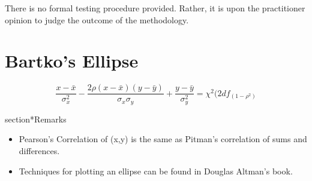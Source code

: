 \documentclass[12pt, a4paper]{report}
\theoremstyle{plain}
\theoremstyle{definition}
\theoremstyle{remark}
\begin{document}
There is no formal testing procedure provided. Rather, it is upon
the practitioner opinion to judge the outcome of the methodology.







%
%



%
%



\section*{Bartko's Ellipse}

\[ \frac{x - \bar{x}}{\sigma^2_x} - \frac{2\rho(x - \bar{x})(y - \bar{y})}{\sigma_x \sigma_y} + \frac{y - \bar{y}}{\sigma^2_y} = \chi^2(2df_(1-\rho^2) \]


section*{Remarks}
\begin{itemize}
	\item Pearson's Correlation of (x,y) is the same as Pitman's correlation of sums and differences.
	
	\item Techniques for plotting an ellipse can be found in Douglas Altman's book.
\end{itemize}
\newpage
\end{document}
